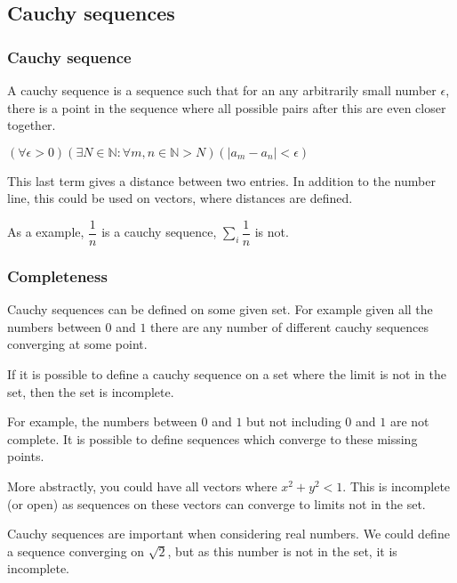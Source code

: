 
\subsection{Cauchy sequences}

\subsubsection{Cauchy sequence}

A cauchy sequence is a sequence such that for an any arbitrarily small number \(\epsilon\), there is a point in the sequence where all possible pairs after this are even closer together.

\((\forall \epsilon >0)(\exists N\in \mathbb{N}: \forall m,n \in \mathbb{N} >N)( |a_m - a_n|<\epsilon)\)

This last term gives a distance between two entries. In addition to the number line, this could be used on vectors, where distances are defined.

As a example, \(\dfrac{1}{n}\) is a cauchy sequence, \(\sum_i \dfrac{1}{n}\) is not.

\subsubsection{Completeness}

Cauchy sequences can be defined on some given set. For example given all the numbers between \(0\) and \(1\) there are any number of different cauchy sequences converging at some point.

If it is possible to define a cauchy sequence on a set where the limit is not in the set, then the set is incomplete.

For example, the numbers between \(0\) and \(1\) but not including \(0\) and \(1\) are not complete. It is possible to define sequences which converge to these missing points.

More abstractly, you could have all vectors where \(x^2+y^2<1\). This is incomplete (or open) as sequences on these vectors can converge to limits not in the set.

Cauchy sequences are important when considering real numbers. We could define a sequence converging on \(\sqrt 2\), but as this number is not in the set, it is incomplete.

